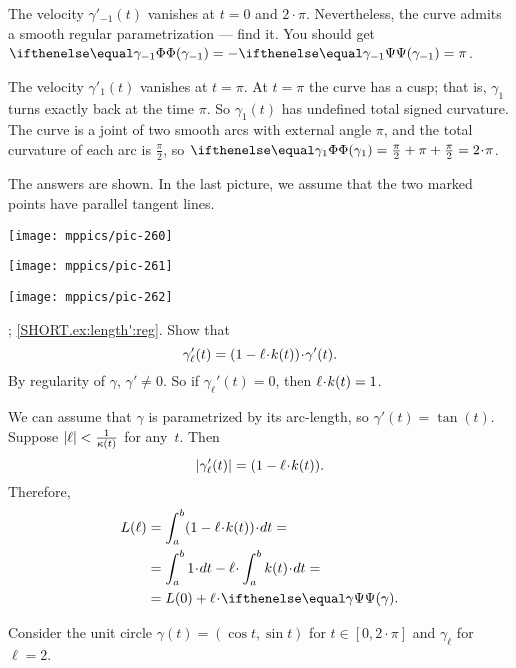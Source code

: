 \begin{multicols}{2}
The velocity $\gamma'_{-1}(t)$ vanishes at $t=0$ and $2\cdot\pi$.
Nevertheless, the curve admits a smooth regular parametrization --- find it.
You should get $\tc{\gamma_{-1}}=-\tgc{\gamma_{-1}}=\pi$.

The velocity $\gamma'_1(t)$ vanishes at $t=\pi$.
At $t=\pi$ the curve has a cusp;
that is, $\gamma_1$ turns exactly back at the time $\pi$.
So $\gamma_1(t)$ has undefined total signed curvature.
The curve is a joint of two smooth arcs with external angle $\pi$, and
the total curvature of each arc is $\tfrac\pi2$, so 
$\tc{\gamma_{1}}=\tfrac\pi2+\pi+\tfrac\pi2=2\cdot\pi$.


The answers are shown.
In the last picture, we assume that the two marked points have parallel tangent lines.

\begin{Figure}
\begin{minipage}{.27\textwidth}
\centering
\texttt{[image: mppics/pic-260]}
\end{minipage}\hfill
\begin{minipage}{.42\textwidth}
\centering
\texttt{[image: mppics/pic-261]}
\end{minipage}
\hfill
\begin{minipage}{.27\textwidth}
\centering
\texttt{[image: mppics/pic-262]}
\end{minipage}
\end{Figure}

\parbf{\ref{ex:length'}}; \ref{SHORT.ex:length':reg}.
Show that
\[
\gamma_\ell'(t)=(1-\ell\cdot\skur(t))\cdot \gamma'(t).
\]
By regularity of $\gamma$, $\gamma'\ne0$.
So if $\gamma_\ell'(t)=0$, then $\ell\cdot \skur(t)= 1$.

 We can assume that $\gamma$ is parametrized by its arc-length, so $\gamma'(t)=\tan(t)$.
Suppose $|\ell|<\frac{1}{\kappa(t)}$ for any~$t$.
Then 
\[
|\gamma_\ell'(t)|=(1-\ell\cdot\skur(t)).
\]
Therefore,
\begin{align*}
L(\ell)
&=
\int_a^b(1-\ell\cdot\skur(t))\cdot dt=
\\&=
\int_a^b 1\cdot dt-\ell\cdot \int_a^b\skur(t)\cdot dt=
\\
&=
L(0)+\ell\cdot\tgc\gamma.
\end{align*}



Consider the unit circle $\gamma(t)=(\cos t,\sin t)$ for $t\in[0,2\cdot\pi]$ and $\gamma_\ell$ for $\ell=2$.


\end{multicols}
